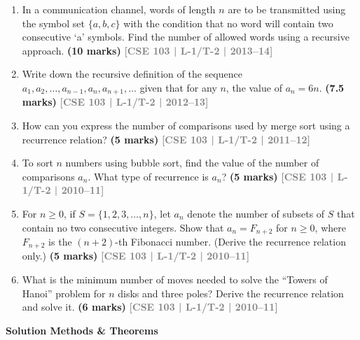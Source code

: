 \documentclass[12pt,a3paper]{article}
\newcommand{\yr}[1]{\hfill\textcolor{gray}{\small\textbf{[#1]}}}
\newcommand{\mk}[1]{\textcolor{orange!70!black}{\small\textbf{(#1 marks)}}}
\newcommand{\subtopic}[2]{%
  \vspace{10pt}
  \noindent\begin{tcolorbox}[colback=#1!8,colframe=#1,boxrule=0.6pt,arc=4pt,
    left=6pt,right=6pt,top=4pt,bottom=4pt]
    \small\bfseries\textcolor{#1}{#2}
  \end{tcolorbox}
  \vspace{2pt}
}
\begin{document}
\begin{enumerate}
\item In a communication channel, words of length $n$ are to be transmitted using the symbol set $\{a, b, c\}$ with the condition that no word will contain two consecutive `a' symbols. Find the number of allowed words using a recursive approach.
\mk{10} \yr{CSE 103 | L-1/T-2 | 2013--14}  

\item Write down the recursive definition of the sequence $a_1, a_2, \ldots, a_{n-1}, a_n, a_{n+1}, \ldots$ given that for any $n$, the value of $a_n = 6n$.
\mk{7.5} \yr{CSE 103 | L-1/T-2 | 2012--13}

\item How can you express the number of comparisons used by merge sort using a recurrence relation?
\mk{5} \yr{CSE 103 | L-1/T-2 | 2011--12}

\item To sort $n$ numbers using bubble sort, find the value of the number of comparisons $a_n$. What type of recurrence is $a_n$?
\mk{5} \yr{CSE 103 | L-1/T-2 | 2010--11}

\item For $n \geq 0$, if $S = \{1, 2, 3, \ldots, n\}$, let $a_n$ denote the number of subsets of $S$ that contain no two consecutive integers. Show that $a_n = F_{n+2}$ for $n \geq 0$, where $F_{n+2}$ is the $(n+2)$-th Fibonacci number. (Derive the recurrence relation only.)
\mk{5} \yr{CSE 103 | L-1/T-2 | 2010--11}

\item What is the minimum number of moves needed to solve the ``Towers of Hanoi'' problem for $n$ disks and three poles? Derive the recurrence relation and solve it.
\mk{6} \yr{CSE 103 | L-1/T-2 | 2010--11}

\end{enumerate}


\subtopic{cD}{Solution Methods \& Theorems}
\label{sub:s7-recurrence-solving}
\end{document}
